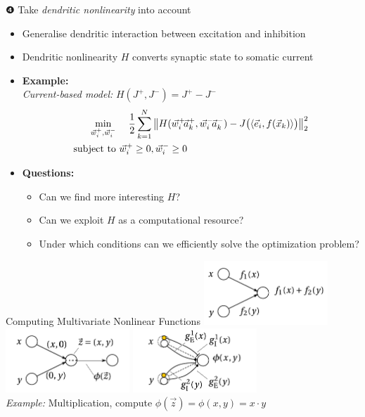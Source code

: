 \documentclass[aspectratio=169]{beamer}
\renewcommand{\emph}[1]{{\color{violet}\textit{#1}}}
\begin{document}
\begin{frame}{❹ Take \emph{dendritic nonlinearity} into account}
	\begin{itemize}
		\setlength{\itemsep}{0.25cm}
		\item Generalise dendritic interaction between excitation and inhibition
		\item Dendritic nonlinearity $H$ converts synaptic state to somatic current
		\item<2-> \textbf{Example:}\\
			\emph{Current-based model:} $H(J^+, J^-) = J^+ - J^-$
			\begin{align*}
			\begin{aligned}
			\min_{\vec w_i^+, \vec w_i^-} &~\hphantom{=\,} \frac{1}2 \sum_{k=1}^N \big\| H( \vec w_i^+\!\vec a_k^+, \vec w_i^-\!\vec a_k^-) - J\big(\langle \vec e_i, f(\vec x_k)\rangle\big) \big\|_2^2 \\
			\text{subject to} &~ \vec w_i^+ \geq 0, \vec w_i^- \geq 0
			\end{aligned}
			\end{align*}
		\item<3-> \textbf{Questions:}
		\begin{itemize}
			\item Can we find more interesting $H$?
			\item Can we exploit $H$ as a computational resource?
			\item Under which conditions can we efficiently solve the optimization problem?
		\end{itemize}
	\end{itemize}
\end{frame}

\begin{frame}{Computing Multivariate Nonlinear Functions}
	\centering
	\includegraphics[width=0.35\textwidth]{media/network_a.pdf}\hspace{1cm}
	\includegraphics[width=0.35\textwidth]{media/network_b.pdf}
	\includegraphics[width=0.35\textwidth]{media/network_c.pdf}\\[0.5cm]
	\emph{Example:} Multiplication, compute $\phi(\vec z) = \phi(x, y) = x \cdot y$
\end{frame}
\end{document}
